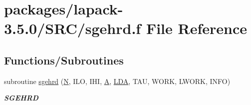 \hypertarget{sgehrd_8f}{}\section{packages/lapack-\/3.5.0/\+S\+R\+C/sgehrd.f File Reference}
\label{sgehrd_8f}
\subsection*{Functions/\+Subroutines}
\begin{DoxyCompactItemize}
\item 
subroutine \hyperlink{group__realGEcomputational_ga971828f964b9d15b72ea12b3d8321d88}{sgehrd} (\hyperlink{polmisc_8c_a0240ac851181b84ac374872dc5434ee4}{N}, I\+L\+O, I\+H\+I, \hyperlink{classA}{A}, \hyperlink{example__user_8c_ae946da542ce0db94dced19b2ecefd1aa}{L\+D\+A}, T\+A\+U, W\+O\+R\+K, L\+W\+O\+R\+K, I\+N\+F\+O)
\begin{DoxyCompactList}\small\item\em {\bfseries S\+G\+E\+H\+R\+D} \end{DoxyCompactList}\end{DoxyCompactItemize}
